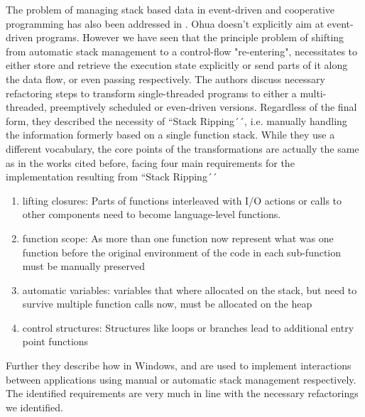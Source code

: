 The problem of managing stack based data in event-driven and cooperative programming has  also been addressed in \cite{adya2002cooperative}. Ohua doesn't explicitly aim at event-driven programs. However we have seen that the principle problem of shifting from automatic stack management to a control-flow "re-entering", necessitates to either store and retrieve the execution state explicitly or send parts of it along the data flow, or even passing respectively. The authors discuss necessary refactoring steps to transform single-threaded programs to either a multi-threaded, preemptively scheduled  or even-driven versions. Regardless of the final form, they described the necessity of ``Stack Ripping´´, i.e. manually handling the information formerly based on a single function stack. While they use a different vocabulary, the core points of the transformations are actually the same as in the works cited before, facing four main requirements for the  implementation resulting from ``Stack Ripping´´
\begin{enumerate}
    \item lifting closures: Parts of functions interleaved with I/O actions or calls to other components need to become language-level functions.
    \item function scope: As more than one function now represent what was one function before the original environment of the code in each sub-function must be manually preserved
    \item automatic variables: variables that where allocated on the stack, but need to survive multiple function calls now, must be allocated on the heap
    \item control structures: Structures like loops or branches lead to additional entry point functions
\end{enumerate}

 Further they describe how in Windows,  and  are used to implement interactions between applications using manual or automatic stack management respectively. The identified requirements are very much in line with the necessary refactorings we identified. 


